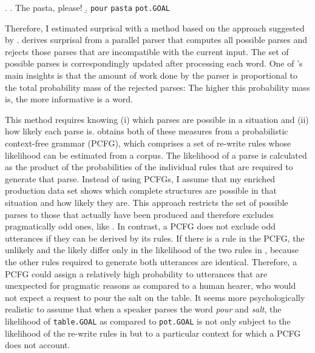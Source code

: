 \ex. \a. The pasta, please!  \label{ex:scripts-production-hale-frag}
     \b. \texttt{pour} \texttt{pasta} \texttt{pot.GOAL} \label{ex:scripts-production-hale-act}

Therefore, I estimated surprisal with a method based on the approach suggested by \citet{hale2001}. \citeauthor{hale2001} derives surprisal from a parallel parser that computes all possible parses and rejects those parses that are incompatible with the current input. The set of possible parses is correspondingly updated after processing each word. One of \citeauthor{hale2001}'s main insights is that the amount of work done by the parser is proportional to the total probability mass of the rejected parses: The higher this probability mass is, the more informative is a word.

This method requires knowing (i) which parses are possible in a situation and (ii) how likely each parse is. \citet{hale2001} obtains both of these measures from a probabilistic context-free grammar (PCFG), which comprises a set of re-write rules whose likelihood can be estimated from a corpus. The likelihood of a parse is calculated as the product of the probabilities of the individual rules that are required to generate that parse. Instead of using PCFGs, I assume that my enriched production data set shows which complete structures are possible in that situation and how likely they are. This approach restricts the set of possible parses to those that actually have been produced and therefore excludes pragmatically odd ones, like \Next. In contrast, a PCFG does not exclude odd utterances if they can be derived by its rules. If there is a rule \NNext[a] in the PCFG, the unlikely \Next and the likely \Last[b] differ only in the likelihood of the two rules in \NNext, because the other rules required to generate both utterances are identical. Therefore, a PCFG could assign a relatively high probability to utterances that are unexpected for pragmatic reasons as compared to a human hearer, who would not expect a request to pour the salt on the table. It seems more psychologically realistic to assume that when a speaker parses the word \textit{pour} and \textit{salt}, the likelihood of \texttt{table.GOAL} as compared to \texttt{pot.GOAL} is not only subject to the likelihood of the re-write rules in \NNext but to a particular context for which a PCFG does not account. 

